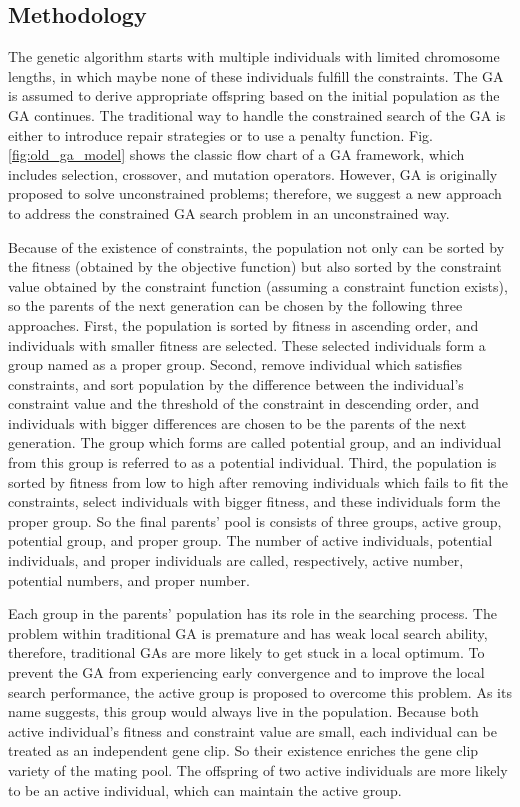 \subsection{Methodology}

The genetic algorithm starts with multiple individuals with limited chromosome lengths, in
which maybe none of these individuals fulfill the constraints. The GA is
assumed to derive appropriate offspring based on the initial population as the
GA continues. The traditional way to handle the constrained search of the GA is
either to introduce repair strategies or to use a penalty function. Fig.
\ref{fig:old_ga_model} shows the classic flow chart of a GA framework, which
includes selection, crossover, and mutation operators. However, GA is originally
proposed to solve unconstrained problems; therefore, we suggest a new approach 
to address the constrained GA search problem in an unconstrained way. 

Because of the existence of constraints, the population not only can be sorted
by the fitness (obtained by the objective function) but also sorted by
the constraint value obtained by the constraint function (assuming a constraint
function exists), so the parents of the next generation can be chosen by the
following three approaches. First, the population is sorted by fitness in
ascending order, and individuals with smaller fitness are selected. These
selected individuals form a group named as a proper group. Second, remove
individual which satisfies constraints, and sort population by the difference
between the individual's constraint value and the threshold of the constraint
in descending order, and individuals with bigger differences are chosen to be
the parents of the next generation. The group which forms are called potential
group, and an individual from this group is referred to as a potential
individual.  Third, the population is sorted by fitness from low to high after
removing individuals which fails to fit the constraints, select individuals
with bigger fitness, and these individuals form the proper group.  So the final
parents' pool is consists of three groups, active group, potential group, and
proper group.  The number of active individuals, potential individuals, and
proper individuals are called, respectively, active number, potential numbers,
and proper number. 

Each group in the parents' population has its role in the searching
process. The problem within traditional GA is premature and has weak local
search ability, therefore, traditional GAs are more likely to get stuck in a
local optimum. To prevent the GA from experiencing early convergence and to
improve the local search performance, the active group is proposed to overcome
this problem. As its name suggests, this group would always live in the
population.  Because both active individual's fitness and constraint value are small,
each individual can be treated as an independent gene clip. So their existence
enriches the gene clip variety of the mating pool. The offspring of two active
individuals are more likely to be an active individual, which can maintain the
active group.

